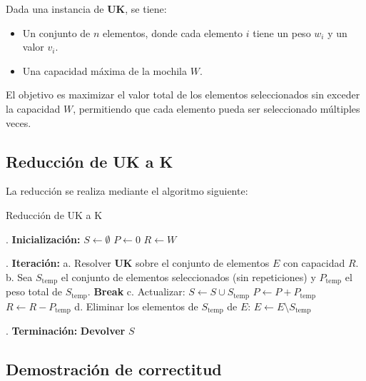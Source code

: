 \documentclass{report}
\begin{document}
Dada una instancia de \textbf{UK}, se tiene:
\begin{itemize}
	\item Un conjunto de \( n \) elementos, donde cada elemento \( i \) tiene un peso \( w_i \) y un valor \( v_i \).
	\item Una capacidad máxima de la mochila \( W \).
\end{itemize}

El objetivo es maximizar el valor total de los elementos seleccionados sin exceder la capacidad \( W \), permitiendo que cada elemento pueda ser seleccionado múltiples veces.

\subsection*{Reducción de UK a K}

La reducción se realiza mediante el algoritmo siguiente:


\begin{algorithm}[H]
	\label{uk_to_k}\caption{Reducción de UK a K}

	\State
	. \textbf{Inicialización:}
	\State \quad \( S \gets \emptyset \)  
	\State \quad \( P \gets 0 \)          
	\State \quad \( R \gets W \)          
	
	\State
	. \textbf{Iteración:}
	\State \quad a. Resolver \textbf{UK} sobre el conjunto de elementos \( E \) con capacidad \( R \).
	\State \quad b. Sea \( S_{\text{temp}} \) el conjunto de elementos seleccionados (sin repeticiones) y \( P_{\text{temp}} \) el peso total de \( S_{\text{temp}} \).
	\State \quad \quad \textbf{Break}  
	\EndIf
	\State \quad c. Actualizar:
	\State \quad \quad \( S \gets S \cup S_{\text{temp}} \)
	\State \quad \quad \( P \gets P + P_{\text{temp}} \)
	\State \quad \quad \( R \gets R - P_{\text{temp}} \)
	\State \quad d. Eliminar los elementos de \( S_{\text{temp}} \) de \( E \): \( E \gets E \setminus S_{\text{temp}} \)
	\EndWhile
	
	\State
	. \textbf{Terminación:}
	\State \quad \textbf{Devolver} \( S \)  
\end{algorithm}

\subsection*{Demostración de correctitud}
\end{document}

